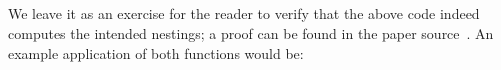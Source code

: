 \begin{code}[hide]
\AgdaSymbol{(}\AgdaSpace{}%
\AgdaSpace{}%
\AgdaSymbol{)}%
\>[21]\AgdaSymbol{=}\AgdaSpace{}%
\AgdaSpace{}%
\AgdaSymbol{(}\AgdaSpace{}%
\AgdaSpace{}%
\AgdaSymbol{)}\AgdaSpace{}%
\<%
\\
%
\\[\AgdaEmptyExtraSkip]%
%
\>[4]\AgdaSpace{}%
\AgdaSymbol{:}\AgdaSpace{}%
\AgdaSpace{}%
\AgdaSymbol{\{}\AgdaSymbol{\}}\AgdaSpace{}%
\AgdaSpace{}%
\AgdaSpace{}%
\AgdaSymbol{(}\AgdaSpace{}%
\AgdaSymbol{)}\<%
\\
%
\>[4]\AgdaSpace{}%
\AgdaSymbol{\{}\AgdaSpace{}%
\AgdaSymbol{\}}%
\>[18]\AgdaSymbol{=}\AgdaSpace{}%
\AgdaSpace{}%
\<%
\\
%
\>[4]\AgdaSpace{}%
\AgdaSymbol{\{}\AgdaSpace{}%
\AgdaSpace{}%
\AgdaSymbol{\}}%
\>[18]\AgdaSymbol{=}\AgdaSpace{}%
\AgdaSpace{}%
\AgdaSymbol{(}\AgdaSpace{}%
\AgdaSymbol{\{}\AgdaSymbol{\})}\AgdaSpace{}%
\<%
\end{code}
We leave it as an exercise for the reader to verify that the above code indeed
computes the intended nestings; a proof can be found in the paper
source~\citep{paper-src}.  An example application of both functions would be:
